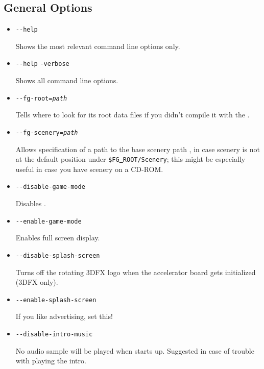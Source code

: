 \subsection{General Options}\label{generaloptions}
\begin{itemize}
\item{\texttt{-$ $-help}}

  Shows the most relevant command line options only.

\item{\texttt{-$ $-help} \texttt{-verbose}}

  Shows all command line options.

\item{\texttt{-$ $-fg-root={\it path}}}

  Tells \FlightGear{} where to look for its root data files if you
  didn't compile it with the .

\item{\texttt{-$ $-fg-scenery={\it path}}}

  Allows specification of a path to the base scenery path
  , in case scenery is not at the default
  position under \texttt{\$FG\underline{~}ROOT/Scenery}; this might
  be especially useful in case you have scenery on a CD-ROM.

\item{\texttt{-$ $-disable-game-mode}}

  Disables .

\item{\texttt{-$ $-enable-game-mode}}

  Enables full screen display.

\item{\texttt{-$ $-disable-splash-screen}}

  Turns off the rotating 3DFX logo when the accelerator board gets
  initialized (3DFX only).

\item{\texttt{-$ $-enable-splash-screen}}

  If you like advertising, set this!

\item{\texttt{-$ $-disable-intro-music}}

  No audio sample will be played when \FlightGear{} starts up.
  Suggested in case of trouble with playing the intro.


\end{itemize}
